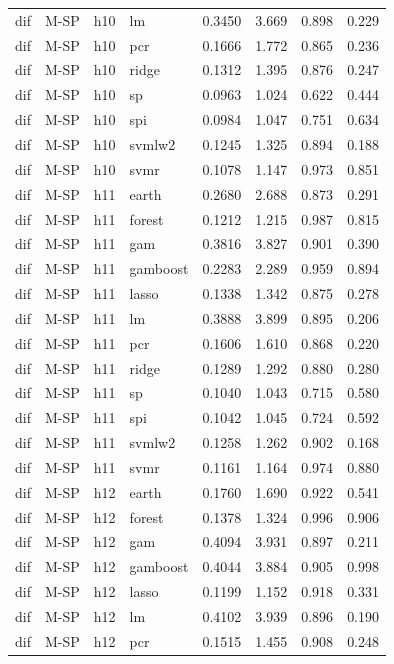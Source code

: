 \begin{ThreePartTable}
\begin{longtable}[t]{llclcccc}
dif & M-SP & h10 & lm & 0.3450 & 3.669 & 0.898 & 0.229\\
dif & M-SP & h10 & pcr & 0.1666 & 1.772 & 0.865 & 0.236\\
dif & M-SP & h10 & ridge & 0.1312 & 1.395 & 0.876 & 0.247\\
dif & M-SP & h10 & sp & 0.0963 & 1.024 & 0.622 & 0.444\\
dif & M-SP & h10 & spi & 0.0984 & 1.047 & 0.751 & 0.634\\
dif & M-SP & h10 & svmlw2 & 0.1245 & 1.325 & 0.894 & 0.188\\
dif & M-SP & h10 & svmr & 0.1078 & 1.147 & 0.973 & 0.851\\
\addlinespace
dif & M-SP & h11 & earth & 0.2680 & 2.688 & 0.873 & 0.291\\
dif & M-SP & h11 & forest & 0.1212 & 1.215 & 0.987 & 0.815\\
dif & M-SP & h11 & gam & 0.3816 & 3.827 & 0.901 & 0.390\\
dif & M-SP & h11 & gamboost & 0.2283 & 2.289 & 0.959 & 0.894\\
dif & M-SP & h11 & lasso & 0.1338 & 1.342 & 0.875 & 0.278\\
dif & M-SP & h11 & lm & 0.3888 & 3.899 & 0.895 & 0.206\\
dif & M-SP & h11 & pcr & 0.1606 & 1.610 & 0.868 & 0.220\\
dif & M-SP & h11 & ridge & 0.1289 & 1.292 & 0.880 & 0.280\\
dif & M-SP & h11 & sp & 0.1040 & 1.043 & 0.715 & 0.580\\
dif & M-SP & h11 & spi & 0.1042 & 1.045 & 0.724 & 0.592\\
dif & M-SP & h11 & svmlw2 & 0.1258 & 1.262 & 0.902 & 0.168\\
dif & M-SP & h11 & svmr & 0.1161 & 1.164 & 0.974 & 0.880\\
\addlinespace
dif & M-SP & h12 & earth & 0.1760 & 1.690 & 0.922 & 0.541\\
dif & M-SP & h12 & forest & 0.1378 & 1.324 & 0.996 & 0.906\\
dif & M-SP & h12 & gam & 0.4094 & 3.931 & 0.897 & 0.211\\
dif & M-SP & h12 & gamboost & 0.4044 & 3.884 & 0.905 & 0.998\\
dif & M-SP & h12 & lasso & 0.1199 & 1.152 & 0.918 & 0.331\\
dif & M-SP & h12 & lm & 0.4102 & 3.939 & 0.896 & 0.190\\
dif & M-SP & h12 & pcr & 0.1515 & 1.455 & 0.908 & 0.248\\

\end{longtable}
\end{ThreePartTable}
